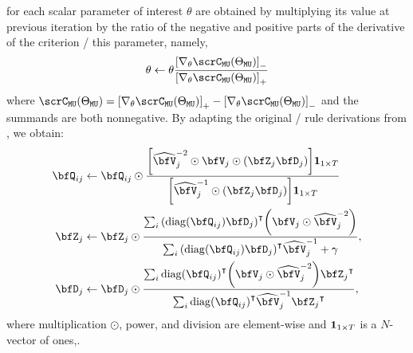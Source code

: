  for each scalar parameter of interest $\theta$ are obtained by multiplying its value at previous iteration by the ratio of the negative and positive parts of the derivative of the criterion \wrt/ this parameter, namely,
\begin{equation*}
    \theta \gets \theta \frac{\kbracket{\knabla_\theta \scrC_{\mathtt{MU}}(\Theta_{\mathtt{MU}})}_{-}}
                             {\kbracket{\knabla_\theta \scrC_{\mathtt{MU}}(\Theta_{\mathtt{MU}})}_{+}}
\end{equation*}
where $\scrC_{\mathtt{MU}}(\Theta_{\mathtt{MU}}) = {\kbracket{\knabla_\theta \scrC_{\mathtt{MU}}(\Theta_{\mathtt{MU}})}_{+}} - {\kbracket{\knabla_\theta \scrC_{\mathtt{MU}}(\Theta_{\mathtt{MU}})}_{-}}$ and the summands are both nonnegative.
By adapting the original \MU/ rule derivations from \citeauthor{ozerov2010multichannel}, we obtain:
\begin{align}
    \vQ_{\idxMicSrc} &\gets\vQ_{\idxMicSrc} \odot \frac{\kbracket{\wh{\mV}_\idxSrc^{-2} \odot \mV_\idxSrc \odot \kparen{\mZ_\idxSrc \mD_\idxSrc}}\onesVect_{1\times T}}{
                                            \kbracket{\wh{\mV}_\idxSrc^{-1} \odot \kparen{\mZ_\idxSrc \mD_\idxSrc}}\onesVect_{1\times T}}\\
    \mZ_\idxSrc &\gets \mZ_\idxSrc \odot \frac{\sum_\idxMic \ktranspose{(\diag(\vQ_{\idxMicSrc}) \mD_\idxSrc)} \kparen{\mV_\idxSrc \odot \wh{\mV}_\idxSrc^{-2}}}{
                                            \sum_\idxMic \ktranspose{(\diag(\vQ_{\idxMicSrc}) \mD_\idxSrc)} \wh{\mV}_\idxSrc^{-1} + \gamma},\\
    \mD_\idxSrc &\gets \mD_\idxSrc \odot \frac{\sum_\idxMic \ktranspose{ \diag(\vQ_{\idxMicSrc})} \kparen{\mV_\idxSrc \odot \wh{\mV}_\idxSrc^{-2}}\ktranspose{\mZ_\idxSrc}}{
                                            \sum_\idxMic \ktranspose{ \diag(\vQ_{\idxMicSrc})} \wh{\mV}_\idxSrc^{-1} \ktranspose{\mZ_\idxSrc}},
\end{align}
where multiplication $\odot$, power, and division are element-wise and $\mathbf{1}_{1\times T}$ is a $N$-vector of ones,.

